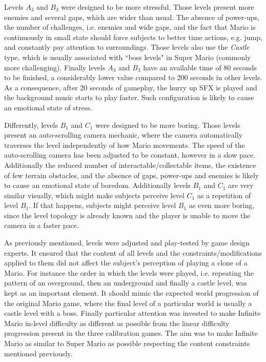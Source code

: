 Levels $A_3$ and $B_3$ were designed to be more stressful. Those levels present more enemies and several gaps, which are wider than usual. The absence of power-ups, the number of challenges, i.e. enemies and wide gaps, and the fact that Mario is continuously in small state should force subjects to better time actions, e.g. jump, and constantly pay attention to surroundings. Those levels also use the \textit{Castle} type, which is usually associated with ``boss levels" in Super Mario (commonly more challenging). Finally levels $A_3$ and $B_3$ have an available time of 80 seconds to be finished, a considerably lower value compared to 200 seconds in other levels. As a consequence, after 20 seconds of gameplay, the hurry up SFX is played and the background music starts to play faster. Such configuration is likely to cause an emotional state of stress.

Differently, levels $B_1$ and $C_1$ were designed to be more boring. Those levels present an auto-scrolling camera mechanic, where the camera automatically traverses the level independently of how Mario movements. The speed of the auto-scrolling camera has been adjusted to be constant, however in a slow pace. Additionally the reduced number of interactable/collectable items, the existence of few terrain obstacles, and the absence of gaps, power-ups and enemies is likely to cause an emotional state of boredom. Additionally levels $B_1$ and $C_1$ are very similar visually, which might make subjects perceive level $C_1$ as a repetition of level $B_1$. If that happens, subjects might perceive level $B_1$ as even more boring, since the level topology is already known and the player is unable to move the camera in a faster pace.

As previously mentioned, levels were adjusted and play-tested by game design experts. It ensured that the content of all levels and the constraints/modifications applied to them did not affect the subject's perception of playing a clone of a Mario. For instance the order in which the levels were played, i.e. repeating the pattern of an overground, then an underground and finally a castle level, was kept as an important element. It should mimic the expected world progression of the original Mario game, where the final level of a particular world is usually a castle level with a boss. Finally particular attention was invested to make Infinite Mario in-level difficulty as different as possible from the linear difficulty progression present in the three calibration games. The aim was to make Infinite Mario as similar to Super Mario as possible respecting the content constraints mentioned previously.


